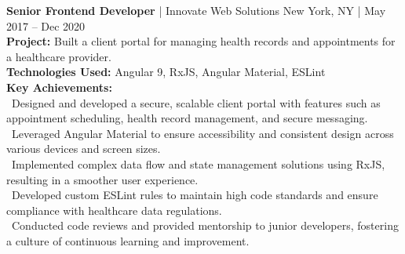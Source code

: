 {\textbf{Senior Frontend Developer} | Innovate Web Solutions \hfill New York, NY | May 2017 – Dec 2020} \\
\textbf{Project:} Built a client portal for managing health records and appointments for a healthcare provider. \\
\textbf{Technologies Used:} Angular 9, RxJS, Angular Material, ESLint \\
\textbf{Key Achievements:} \\
\hspace*{4pt} \textbullet~Designed and developed a secure, scalable client portal with features such as appointment scheduling, health record management, and secure messaging. \\
\hspace*{4pt} \textbullet~Leveraged Angular Material to ensure accessibility and consistent design across various devices and screen sizes. \\
\hspace*{4pt} \textbullet~Implemented complex data flow and state management solutions using RxJS, resulting in a smoother user experience. \\
\hspace*{4pt} \textbullet~Developed custom ESLint rules to maintain high code standards and ensure compliance with healthcare data regulations. \\
\hspace*{4pt} \textbullet~Conducted code reviews and provided mentorship to junior developers, fostering a culture of continuous learning and improvement. \\[4pt]

